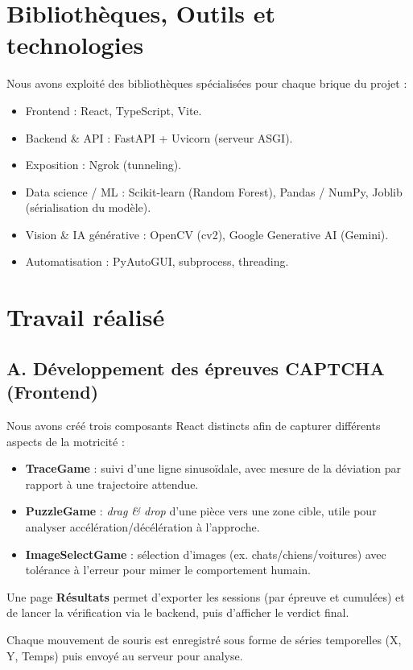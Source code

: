 \documentclass[a4paper, 12pt, twoside]{article}
\begin{document}
\section{Bibliothèques, Outils et technologies}
Nous avons exploité des bibliothèques spécialisées pour chaque brique du projet :

\begin{itemize}
    \item Frontend : React, TypeScript, Vite.
    \item Backend \& API : FastAPI + Uvicorn (serveur ASGI).
    \item Exposition : Ngrok (tunneling).
    \item Data science / ML : Scikit-learn (Random Forest), Pandas / NumPy, Joblib (sérialisation du modèle).
    \item Vision \& IA générative : OpenCV (cv2), Google Generative AI (Gemini).
    \item Automatisation : PyAutoGUI, subprocess, threading.
\end{itemize}

\section{Travail réalisé}

\subsection*{A. Développement des épreuves CAPTCHA (Frontend)}
Nous avons créé trois composants React distincts afin de capturer différents aspects de la motricité :
\begin{itemize}
    \item \textbf{TraceGame} : suivi d'une ligne sinusoïdale, avec mesure de la déviation par rapport à une trajectoire attendue.
    \item \textbf{PuzzleGame} : \textit{drag \& drop} d'une pièce vers une zone cible, utile pour analyser accélération/décélération à l'approche.
    \item \textbf{ImageSelectGame} : sélection d'images (ex. chats/chiens/voitures) avec tolérance à l'erreur pour mimer le comportement humain.
\end{itemize}
Une page \textbf{Résultats} permet d'exporter les sessions (par épreuve et cumulées) et de lancer la vérification via le backend, puis d'afficher le verdict final.

Chaque mouvement de souris est enregistré sous forme de séries temporelles (X, Y, Temps) puis envoyé au serveur pour analyse.
\end{document}
